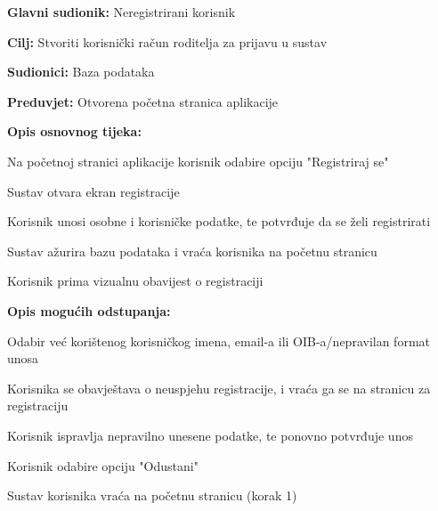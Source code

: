 					\begin{packed_item}
						
						\item \textbf{Glavni sudionik: }Neregistrirani korisnik
						\item  \textbf{Cilj:} Stvoriti korisnički račun roditelja za prijavu u sustav
						\item  \textbf{Sudionici:} Baza podataka
						\item  \textbf{Preduvjet:} Otvorena početna stranica aplikacije
						\item  \textbf{Opis osnovnog tijeka:}
						
						\item[] \begin{packed_enum}
							
							\item Na početnoj stranici aplikacije korisnik odabire opciju "Registriraj se"
							\item Sustav otvara ekran registracije
							\item Korisnik unosi osobne i korisničke podatke, te potvrđuje da se želi registrirati
							\item Sustav ažurira bazu podataka i vraća korisnika na početnu stranicu
							\item Korisnik prima vizualnu obavijest o registraciji
						\end{packed_enum}
						
						\item  \textbf{Opis mogućih odstupanja:}
						\item[] \begin{packed_item}
							\item[3.a] Odabir već korištenog korisničkog imena, email-a ili OIB-a/nepravilan format unosa
							\item[] \begin{packed_enum}
								\item Korisnika se obavještava o neuspjehu registracije, i vraća ga se na stranicu za registraciju
								\item Korisnik ispravlja nepravilno unesene podatke, te ponovno potvrđuje unos
							\end{packed_enum}
							\item[3.b] Korisnik odabire opciju "Odustani"
							\item[] \begin{packed_enum}
								\item Sustav korisnika vraća na početnu stranicu (korak 1)
							\end{packed_enum}
							
						\end{packed_item}
					\end{packed_item}
					
